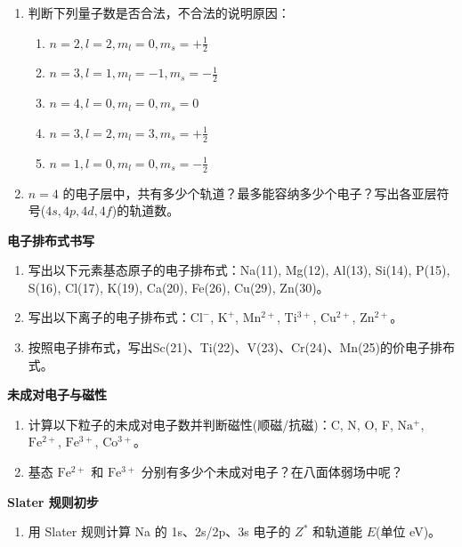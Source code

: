 \begin{enumerate}
\def\labelenumi{\arabic{enumi}.}
\tightlist
\item
  判断下列量子数是否合法，不合法的说明原因：

  \begin{enumerate}
  \def\labelenumii{(\alph{enumii})}
  \tightlist
  \item
    \(n=2, l=2, m_l=0, m_s=+\frac{1}{2}\)
  \item
    \(n=3, l=1, m_l=-1, m_s=-\frac{1}{2}\)
  \item
    \(n=4, l=0, m_l=0, m_s=0\)
  \item
    \(n=3, l=2, m_l=3, m_s=+\frac{1}{2}\)
  \item
    \(n=1, l=0, m_l=0, m_s=-\frac{1}{2}\)
  \end{enumerate}
\item
  \(n=4\) 的电子层中，共有多少个轨道？最多能容纳多少个电子？写出各亚层符号(\(4s, 4p, 4d, 4f\))的轨道数。
\end{enumerate}

\textbf{电子排布式书写}

\begin{enumerate}
\def\labelenumi{\arabic{enumi}.}
\setcounter{enumi}{2}
\item
  写出以下元素基态原子的电子排布式：Na(11), Mg(12), Al(13), Si(14), P(15), S(16), Cl(17), K(19), Ca(20), Fe(26), Cu(29), Zn(30)。
\item
  写出以下离子的电子排布式：\(\mathrm{Cl^-}\), \(\mathrm{K^+}\), \(\mathrm{Mn^{2+}}\), \(\mathrm{Ti^{3+}}\), \(\mathrm{Cu^{2+}}\), \(\mathrm{Zn^{2+}}\)。
\item
  按照电子排布式，写出Sc(21)、Ti(22)、V(23)、Cr(24)、Mn(25)的价电子排布式。
\end{enumerate}

\textbf{未成对电子与磁性}

\begin{enumerate}
\def\labelenumi{\arabic{enumi}.}
\setcounter{enumi}{5}
\item
  计算以下粒子的未成对电子数并判断磁性(顺磁/抗磁)：C, N, O, F, \(\mathrm{Na^+}\), \(\mathrm{Fe^{2+}}\), \(\mathrm{Fe^{3+}}\), \(\mathrm{Co^{3+}}\)。
\item
  基态 \(\mathrm{Fe^{2+}}\) 和 \(\mathrm{Fe^{3+}}\) 分别有多少个未成对电子？在八面体弱场中呢？
\end{enumerate}

\textbf{Slater 规则初步}

\begin{enumerate}
\def\labelenumi{\arabic{enumi}.}
\setcounter{enumi}{7}
\tightlist
\item
  用 Slater 规则计算 Na 的 1s、2s/2p、3s 电子的 \(Z^*\) 和轨道能 \(E\)(单位 eV)。
\end{enumerate}

